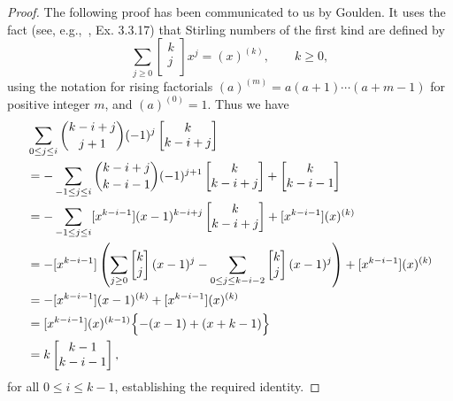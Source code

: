 \documentclass[11pt]{amsart}
\theoremstyle{plain}
\theoremstyle{remark}
\begin{document}
\begin{proof}
The following proof has been communicated to us by Goulden.
It uses the fact (see, e.g.,~\cite{GJbook}, Ex. 3.3.17) 
that Stirling numbers of the first kind are defined by 
$$\sum_{j \ge 0} \left[  \begin{matrix} k \\ j\\ \end{matrix} \right]
    x^j = (x)^{(k)},\qquad k\ge 0,$$
using the notation for rising factorials $(a)^{(m)} =a(a+1)\cdots (a+m-1)$
for positive integer $m$, and $(a)^{(0)}=1$. Thus we have
    \begin{align*}
        &\sum_{0 \leq j \leq i} \binom{k-i+j}{j+1}(-1)^j \left[ \begin{matrix}
k\\ k-i+j\\ \end{matrix} \right]  \\
        &= - \sum_{-1 \leq j \leq i} \binom{k-i+j}{k-i-1}(-1)^{j+1} \left[
\begin{matrix} k\\ k-i+j\\ \end{matrix} \right] + \left[ \begin{matrix} k\\
k-i-1\\ \end{matrix} \right]  \\
        &= - \sum_{-1 \leq j \leq i} [x^{k-i-1}] (x-1)^{k-i+j} \left[
\begin{matrix} k\\
k-i+j\\ \end{matrix} \right] + [x^{k-i-1}] (x)^{(k)} \\
        &= - [x^{k-i-1}]\left( \sum_{j \geq 0} \left[
\begin{matrix} k\\
j\\ \end{matrix} \right](x-1)^{j} - \sum_{0 \leq j \leq k-i-2}\left[
\begin{matrix} k\\
j\\ \end{matrix} \right](x-1)^{j} \right) + [x^{k-i-1}] (x)^{(k)} \\
	&= -[x^{k-i-1}](x-1)^{(k)} + [x^{k-i-1}] (x)^{(k)} \\
        &=[x^{k-i-1}] (x)^{(k-1)} \Bigl\{ -(x-1)+(x+k-1) \Bigr\} \\
        &= k \left[ \begin{matrix} k-1 \\ k-i-1 \\ \end{matrix} \right],
    \end{align*}
for all $0 \le i \le k-1$, establishing the required identity.
\end{proof}
\end{document}
